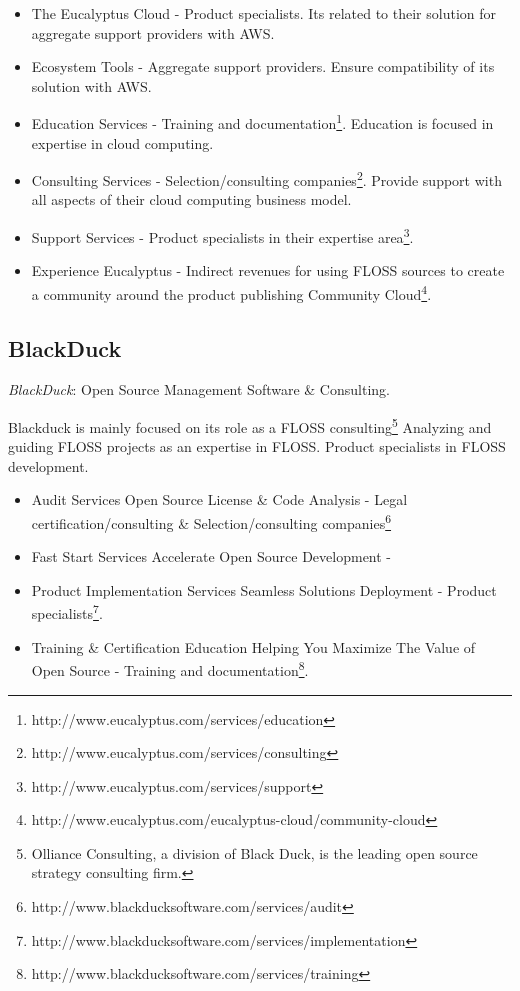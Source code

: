 \documentclass[11pt]{scrartcl}
\begin{document}
\begin{itemize}
	\item The Eucalyptus Cloud - Product specialists. Its related to their solution for aggregate support providers with AWS.
	\item Ecosystem Tools - Aggregate support providers. Ensure compatibility of its solution with AWS.
	\item Education Services - Training and documentation\footnote{http://www.eucalyptus.com/services/education}. Education is focused in expertise in cloud computing. 
	\item Consulting Services - Selection/consulting companies\footnote{http://www.eucalyptus.com/services/consulting}. Provide support with all aspects of their cloud computing business model.
	\item Support Services - Product specialists in their expertise area\footnote{http://www.eucalyptus.com/services/support}.
	\item Experience Eucalyptus - Indirect revenues for using FLOSS sources to create a community around the product publishing Community Cloud\footnote{http://www.eucalyptus.com/eucalyptus-cloud/community-cloud}.
\end{itemize}

\subsection{BlackDuck}

\par \emph{BlackDuck}: Open Source Management Software \& Consulting.

\par Blackduck is mainly focused on its role as a FLOSS consulting\footnote{Olliance Consulting, a division of Black Duck, is the leading open source strategy consulting firm.} Analyzing and guiding FLOSS projects as an expertise in FLOSS. Product specialists in FLOSS development.

\begin{itemize}
	\item Audit Services Open Source License \& Code Analysis - Legal certification/consulting \& Selection/consulting companies\footnote{http://www.blackducksoftware.com/services/audit}
	\item Fast Start Services Accelerate Open Source Development - 
	\item Product Implementation Services Seamless Solutions Deployment - Product specialists\footnote{http://www.blackducksoftware.com/services/implementation}.
	\item Training \& Certification Education Helping You Maximize The Value of Open Source - Training and documentation\footnote{http://www.blackducksoftware.com/services/training}.
\end{itemize}
\end{document}
